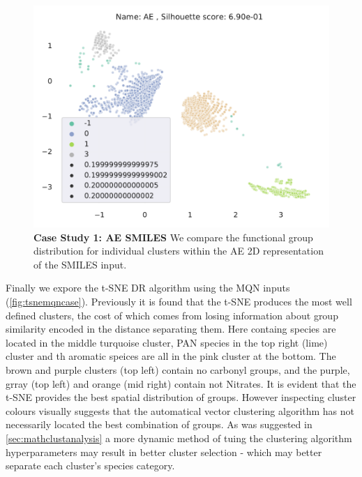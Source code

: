 \begin{figure}[H]
    \centering
    \includegraphics[height=\textwidth]{outputs/AE/smiles_all.pdf}
    \caption{\textbf{Case Study 1: AE SMILES} We compare the functional group distribution for individual clusters within the AE 2D representation of the SMILES input.}
    \label{fig:aesmilescase}
\end{figure}

Finally we expore the t-SNE DR algorithm using the MQN inputs (\autoref{fig:tsnemqncase}). Previously it is found that the t-SNE produces the most well defined clusters, the cost of which comes from losing information about group similarity encoded in the distance separating them. Here  containg species are located in the middle turquoise cluster, PAN species in the top right (lime) cluster and th aromatic speices are all in the pink cluster at the bottom.
The brown and purple clusters (top left) contain no carbonyl groups, and the purple, grray (top left) and orange (mid right) contain not Nitrates. It is evident that the t-SNE provides the best spatial distribution of groups. However inspecting cluster colours visually suggests that the automatical vector clustering algorithm has not necessarily located the best combination of groups. As was suggested in \autoref{sec:mathclustanalysis} a more dynamic method of tuing the clustering algorithm hyperparameters may result in better cluster selection - which may better separate each cluster's species category.

